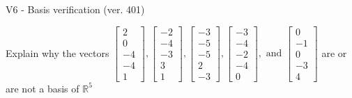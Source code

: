 \begin{exercise}
  \begin{exerciseTitle}V6 - Basis verification (ver. 401)\end{exerciseTitle}
  \begin{exerciseStatement}
    Explain why the vectors \(\left[\begin{array}{r}
2 \\
0 \\
-4 \\
-4 \\
1
\end{array}\right] , \left[\begin{array}{r}
-2 \\
-4 \\
-3 \\
3 \\
1
\end{array}\right] , \left[\begin{array}{r}
-3 \\
-5 \\
-5 \\
2 \\
-3
\end{array}\right] , \left[\begin{array}{r}
-3 \\
-4 \\
-2 \\
-4 \\
0
\end{array}\right] , \text{ and } \left[\begin{array}{r}
0 \\
-1 \\
0 \\
-3 \\
4
\end{array}\right]\) are or are not a basis of \(\mathbb{R}^5\)	



\end{exerciseStatement}
\end{exercise}
